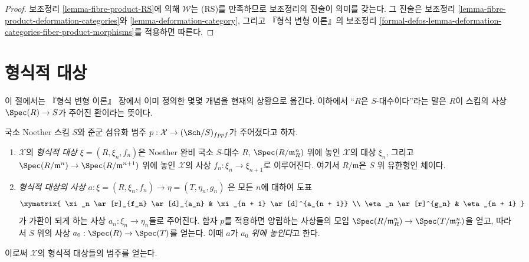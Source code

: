 \begin{proof}
보조정리 \ref{lemma-fibre-product-RS}에 의해 $\mathcal{W}$는 (RS)를
만족하므로 보조정리의 진술이 의미를 갖는다. 그 진술은 보조정리
\ref{lemma-fibre-product-deformation-categories}와
\ref{lemma-deformation-category}, 그리고 『형식 변형 이론』의 보조정리
\ref{formal-defos-lemma-deformation-categories-fiber-product-morphisms}를
적용하면 따른다.
\end{proof}






\section{형식적 대상}
\label{section-formal-objects}

\noindent
이 절에서는 『형식 변형 이론』 장에서 이미 정의한 몇몇 개념을 현재의
상황으로 옮긴다. 이하에서 ``$R$은 $S$-대수이다''라는 말은 $R$이
스킴의 사상 $\Spec(R) \to S$가 주어진 환이라는 뜻이다.

\begin{definition}
\label{definition-formal-objects}
국소 Noether 스킴 $S$와 준군 섬유화 범주
$p : \mathcal{X} \to (\Sch/S)_{fppf}$가 주어졌다고 하자.
\begin{enumerate}
\item $\mathcal{X}$의 {\it 형식적 대상} $\xi = (R, \xi_n, f_n)$은
Noether 완비 국소 $S$-대수 $R$, $\Spec(R/\mathfrak m_R^n)$ 위에 놓인
$\mathcal{X}$의 대상 $\xi_n$, 그리고
$\Spec(R/\mathfrak m^n) \to \Spec(R/\mathfrak m^{n + 1})$ 위에 놓인
$\mathcal{X}$의 사상 $f_n : \xi_n \to \xi_{n + 1}$로 이루어진다.
여기서 $R/\mathfrak m$은 $S$ 위 유한형인 체이다.
\item {\it 형식적 대상의 사상}
$a : \xi = (R, \xi_n, f_n) \to \eta = (T, \eta_n, g_n)$
은 모든 $n$에 대하여 도표
$$
\xymatrix{
\xi_n \ar[r]_{f_n} \ar[d]_{a_n} & \xi_{n + 1} \ar[d]^{a_{n + 1}} \\
\eta_n \ar[r]^{g_n} & \eta_{n + 1}
}
$$
가 가환이 되게 하는 사상 $a_n : \xi_n \to \eta_n$들로 주어진다.
함자 $p$를 적용하면 양립하는 사상들의 모임
$\Spec(R/\mathfrak m_R^n) \to \Spec(T/\mathfrak m_T^n)$을 얻고, 따라서
$S$ 위의 사상 $a_0 : \Spec(R) \to \Spec(T)$를 얻는다. 이때 $a$가
$a_0$ {\it 위에 놓인다}고 한다.
\end{enumerate}
\end{definition}

\noindent
이로써 $\mathcal{X}$의 형식적 대상들의 범주를 얻는다.

